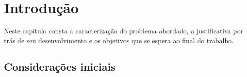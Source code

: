 
\chapter{Introdução}\label{cap:introducao}

Neste capítulo consta a caracterização do problema abordado, a justificativa por trás de seu desenvolvimento e os objetivos que se espera ao final do trabalho.


\section{Considerações iniciais}\label{sec:consideracoesIniciais}




